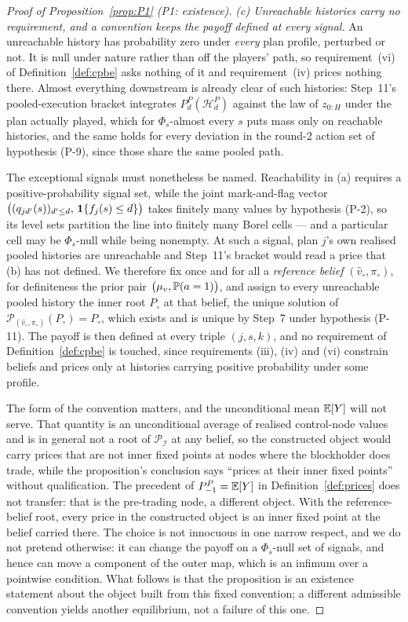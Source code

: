 \begin{proof}[Proof of Proposition~\ref{prop:P1} (P1: existence)]
\emph{(c) Unreachable histories carry no requirement, and a convention keeps the payoff defined at
every signal.} An unreachable history has probability zero under \emph{every} plan profile,
perturbed or not. It is null under nature rather than off the players' path, so requirement~(vi) of
Definition~\ref{def:cpbe} asks nothing of it and requirement~(iv) prices nothing there. Almost
everything downstream is already clear of such histories: Step~11's pooled-execution bracket
integrates $P_d^P(\mathcal H_d^P)$ against the law of $z_{0:H}$ under the plan actually played, which
for $\Phi_s$-almost every $s$ puts mass only on reachable histories, and the same holds for every
deviation in the round-2 action set of hypothesis (P-9), since those share the same pooled path.

The exceptional signals must nonetheless be named. Reachability in (a) requires a
positive-probability signal set, while the joint mark-and-flag vector
$\bigl((q_{jd'}(s))_{d' \le d},\,\mathbf{1}\{f_j(s) \le d\}\bigr)$ takes finitely many values by hypothesis
(P-2), so its level sets partition the line into finitely many Borel cells --- and a particular cell
may be $\Phi_s$-null while being nonempty. At such a signal, plan $j$'s own realised pooled histories
are unreachable and Step~11's bracket would read a price that (b) has not defined. We therefore fix
once and for all a \emph{reference belief} $(\hat v_\circ,\pi_\circ)$, for definiteness the prior pair
$\bigl(\mu_v,\mathbb{P}(a=1)\bigr)$, and assign to every unreachable pooled history the inner root
$P_\circ$ at that belief, the unique solution of
$\mathcal P_{(\hat v_\circ,\pi_\circ)}(P_\circ) = P_\circ$, which exists and is unique by Step~7 under
hypothesis (P-11). The payoff is then defined at every triple $(j,s,k)$, and no requirement of
Definition~\ref{def:cpbe} is touched, since requirements (iii), (iv) and (vi) constrain beliefs and
prices only at histories carrying positive probability under some profile.

The form of the convention matters, and the unconditional mean $\mathbb{E}[Y]$ will not serve. That
quantity is an unconditional average of realised control-node values and is in general not a root of
$\mathcal P_{\mathcal I}$ at any belief, so the constructed object would carry prices that are not
inner fixed points at nodes where the blockholder does trade, while the proposition's conclusion says
``prices at their inner fixed points'' without qualification. The precedent of
$P_{-1}^P = \mathbb{E}[Y]$ in Definition~\ref{def:prices} does not transfer: that is the pre-trading node, a
different object. With the reference-belief root, every price in the constructed object is an inner
fixed point at the belief carried there. The choice is not innocuous in one narrow respect, and we do
not pretend otherwise: it can change the payoff on a $\Phi_s$-null set of signals, and hence can move
a component of the outer map, which is an infimum over a pointwise condition. What follows is that
the proposition is an existence statement about the object built from this fixed convention; a
different admissible convention yields another equilibrium, not a failure of this one.


\end{proof}
